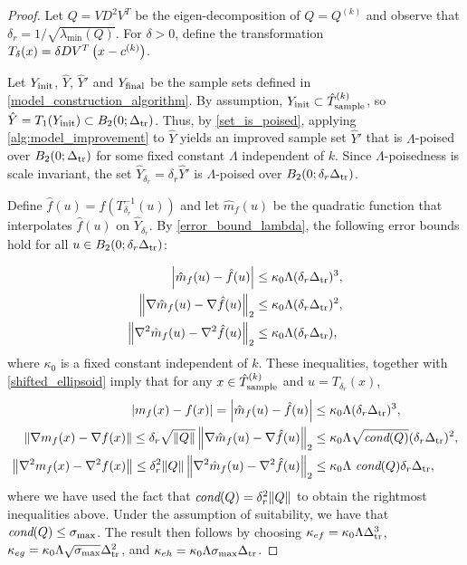 \documentclass{article}
\begin{document}
\begin{proof}


Let $Q= VD^2V^T$ be the eigen-decomposition of $Q=Q^{(k)}$ and observe that 
$\delta_r = 1/\sqrt{\lambda_{\textrm{min}}(Q)}$.
For $\delta > 0$,  define the transformation $T_{\delta}(x) = \delta D V^T\left(x - c^{(k)}\right)$. 


Let $Y_{\textrm{init}}$, $\hat{Y}$, $\hat{Y}'$ and $Y_{\textrm{final}}$ be the sample sets defined in \cref{model_construction_algorithm}.   By assumption, $Y_{\textrm{init}} \subset {\hat{T}_{\text{sample}}^{(k)}}$, so $\hat{Y} = T_1(Y_{\textrm{init}}) \subset B_2(0;\Delta_{\textrm{tr}})$.   Thus, by \cref{set_is_poised},  applying \cref{alg:model_improvement} to $\hat{Y}$ yields an improved sample set $\hat{Y}'$ that is $\Lambda$-poised over $B_2(0;\Delta_{\textrm{tr}})$ for some fixed constant $\Lambda$ independent of $k$.    Since $\Lambda$-poisedness is scale invariant,  the set $\hat{Y}_{\delta_r} = \delta_r \hat{Y}'$ is $\Lambda$-poised over $B_2(0;\delta_r\Delta_{\textrm{tr}})$.   


 Define $\hat{f}(u) = f(T_{\delta_r}^{-1}(u))$ and let $\hat{m}_f(u)$ be the quadratic function that interpolates $\hat{f}(u)$ on $\hat{Y}_{\delta_r}$.    By \cref{error_bound_lambda}, the following error bounds hold for all $u \in B_2(0;\delta_r \Delta_{\textrm{tr}})$:

\begin{align}
\left|\hat{m}_f(u)-\hat{f}(u)\right| & \le \kappa_0 \Lambda(\delta_r \Delta_{\textrm{tr}})^3,\\
\left\|\nabla \hat{m}_f(u)-\nabla \hat{f}(u)\right\|_2 & \le \kappa_0 \Lambda (\delta_r\Delta_{\textrm{tr}})^2, \\
\left\|\nabla^2 \hat{m}_f(u)-\nabla^2 \hat{f}(u)\right\|_2 &  \le \kappa_0 \Lambda (\delta_r \Delta_{\textrm{tr}}),
\end{align}
where $\kappa_0$ is a fixed constant independent of $k$.    These inequalities, together with \cref{shifted_ellipsoid} imply that for any $x \in {\hat{T}_{\text{sample}}^{(k)}}$ and $u=T_{\delta_r}(x)$, 
\begin{align}
\left|m_f(x)-f(x)\right| = \left|\hat{m}_f(u)-\hat{f}(u)\right| & \le \kappa_0 \Lambda(\delta_r \Delta_{\textrm{tr}})^3,\\
\left\|\nabla m_f(x) -\nabla f(x)\right\| \le \delta_r \sqrt{\|Q\|}
\left\|\nabla \hat{m}_f(u)-\nabla \hat{f}(u)\right\|_2 & \le \kappa_0 \Lambda \sqrt{\textit{cond}(Q)} (\delta_r\Delta_{\textrm{tr}})^2, \\
\left\|\nabla^2 m_f(x)-\nabla^2 f(x)\right\| \le \delta_r^2 \|Q\| \left\|\nabla^2 \hat{m}_f(u)-\nabla^2 \hat{f}(u)\right\|_2 &  \le \kappa_0 \Lambda\   \textit{cond}(Q) \delta_r \Delta_{\textrm{tr}},
\end{align}
where we have used the fact that $\textit{cond}(Q)=\delta_r^2 \|Q\|$ to obtain the rightmost inequalities above.    Under the assumption of suitability, we have that $\textit{cond}(Q) \le \sigma_{\textrm{max}}$.   The result then follows by choosing $\kappa_{ef} = \kappa_0 \Lambda \Delta_{\textrm{tr}}^3$, $\kappa_{eg}=\kappa_0 \Lambda \sqrt{\sigma_{\textrm{max}}} \Delta_{\textrm{tr}}^2$, and $\kappa_{eh} = \kappa_0 \Lambda \sigma_{\textrm{max}} \Delta_{\textrm{tr}}$.
\end{proof}
\end{document}
